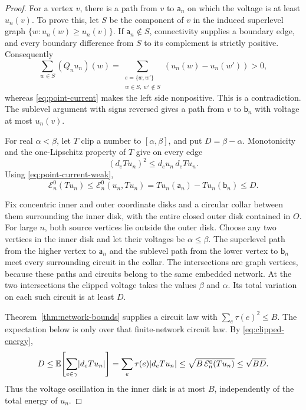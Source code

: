 \begin{proof}
For a vertex \(v\), there is a path from \(v\) to \(\mathsf a_n\) on which the
voltage is at least \(u_n(v)\).  To prove this, let \(S\) be the component
of \(v\) in the induced superlevel graph
\(\{w:u_n(w)\ge u_n(v)\}\).  If \(\mathsf a_n\notin S\), connectivity supplies
a boundary edge, and every boundary difference from \(S\) to its
complement is strictly positive.  Consequently
\[
 \sum_{w\in S}(Q_nu_n)(w)
   =\sum_{\substack{e=\{w,w'\}\\w\in S,\ w'\notin S}}
                   (u_n(w)-u_n(w'))>0,
\]
whereas \eqref{eq:point-current} makes the left side nonpositive.
This is a contradiction.  The sublevel argument with signs reversed
gives a path from \(v\) to \(\mathsf b_n\) with voltage at most \(u_n(v)\).

For real \(\alpha<\beta\), let \(T\) clip a number to
\([\alpha,\beta]\), and put \(D=\beta-\alpha\).  Monotonicity and the
one-Lipschitz property of \(T\) give on every edge
\[
 (d_e Tu_n)^2\le d_e u_n\,d_e Tu_n.
\]
Using \eqref{eq:point-current-weak},
\begin{equation}\label{eq:clipped-energy}
 \mathcal E_n^0(Tu_n)
 \le \mathcal E_n^0(u_n,Tu_n)
 =Tu_n(\mathsf a_n)-Tu_n(\mathsf b_n)\le D.
\end{equation}

Fix concentric inner and outer coordinate disks and a circular collar
between them surrounding the inner disk, with the entire closed outer
disk contained in \(O\).  For large \(n\), both source vertices lie
outside the outer disk.
Choose any two vertices in the inner disk and let their voltages be
\(\alpha\le\beta\).  The superlevel path from the higher vertex to
\(\mathsf a_n\) and the sublevel path from the lower vertex to \(\mathsf b_n\) meet every
surrounding circuit in the collar.  The intersections are graph vertices,
because these paths and circuits belong to the same embedded network.
At the two intersections the clipped voltage takes the values \(\beta\)
and \(\alpha\).  Its total variation on each such circuit is at least \(D\).

Theorem~\ref{thm:network-bounds} supplies a circuit law with
\(\sum_e\tau(e)^2\le B\).  The expectation below is only over that
finite-network circuit law.  By \eqref{eq:clipped-energy},
\[
 D\le
 \mathbb E\!\left[\sum_{e\in\gamma}\lvert d_e Tu_n\rvert\right]
 =\sum_e\tau(e)\lvert d_e Tu_n\rvert
 \le \sqrt{B\,\mathcal E_n^0(Tu_n)}
 \le\sqrt{BD}.
\]
Thus the voltage oscillation in the inner disk is at most \(B\),
independently of the total energy of \(u_n\).


\end{proof}
